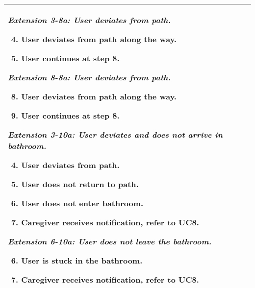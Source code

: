 \begin{tabular}{|p{}||p{}|}
        \vspace{4mm}
        \hline
        \vspace{2mm}
        
        \textit{Extension 3-8a: User deviates from path.}
        
        \begin{enumerate}
            \setcounter{enumi}{3}
            \item User deviates from path along the way.
            \item User continues at step 8.
        \end{enumerate}
        
        \vspace{4mm}
        \hline
        \vspace{2mm}
        
        \textit{Extension 8-8a: User deviates from path.}
        
        \begin{enumerate}
            \setcounter{enumi}{7}
            \item User deviates from path along the way.
            \item User continues at step 8.
        \end{enumerate}
        
        \vspace{4mm}
        \hline
        \vspace{2mm}
        
        \textit{Extension 3-10a: User deviates and does not arrive in bathroom.}
        
        \begin{enumerate}
            \setcounter{enumi}{3}
            \item User deviates from path.
            \item User does not return to path.
            \item User does not enter bathroom.
            \item Caregiver receives notification, refer to UC8.
        \end{enumerate}
        
        \vspace{4mm}
        \hline
        \vspace{2mm}
        
        \textit{Extension 6-10a: User does not leave the bathroom.}
        
        \begin{enumerate}
            \setcounter{enumi}{5}
            \item User is stuck in the bathroom.
            \item Caregiver receives notification, refer to UC8.
        \end{enumerate}\\
        \hline
    \end{tabular}
